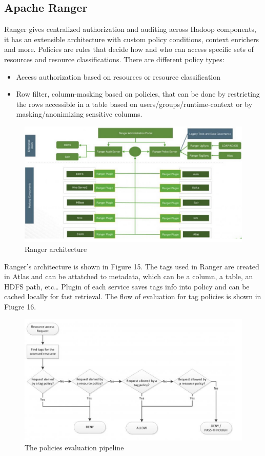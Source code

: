 \subsection{Apache Ranger}
Ranger gives centralized authorization and auditing across Hadoop components, it has an extensible architecture with custom policy conditions, context enrichers and more. \n
Policies are rules that decide how and who can access specific sets of resources and resource classifications. There are different policy types:
\begin{itemize}
    \item Access authorization based on resources or resource classification
    \item Row filter, column-masking based on policies, that can be done by restricting the rows accessible in a table based on users/groups/runtime-context or by masking/anonimizing sensitive columns.
\end{itemize}
\begin{figure}
    \centering
    \includegraphics[scale=0.2]{Images/Ranger_architecture.jpeg}
    \caption{Ranger architecture}
\end{figure}
Ranger's architecture is shown in Figure 15. \n
The tags used in Ranger are created in Atlas and can be attatched to metadata, which can be a column, a table, an HDFS path, etc\dots \n
Plugin of each service saves tags info into policy and can be cached locally for fast retrieval. The flow of evaluation for tag policies is shown in Fiugre 16.
\begin{figure}
    \centering
    \includegraphics[scale=0.2]{Images/policies_evaluation.jpeg}
    \caption{The policies evaluation pipeline}
\end{figure}
